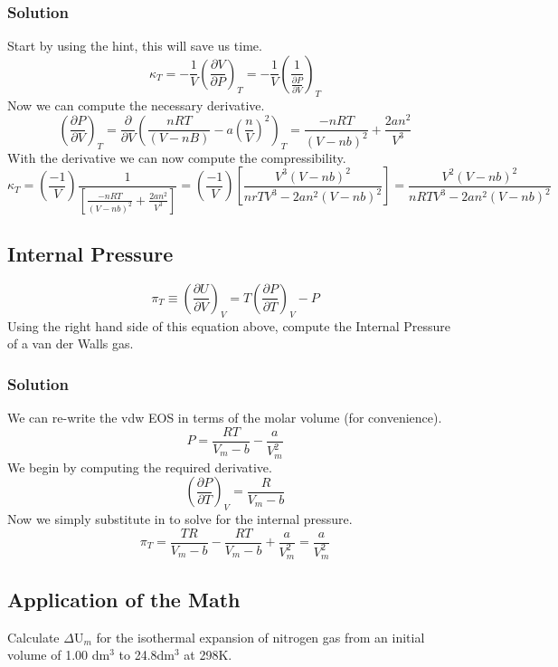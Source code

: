 \documentclass{article}
\newcommand{\be}{\begin{equation}}
\newcommand{\ee}{\end{equation}}
\newcommand{\pd}{\partial}
\begin{document}
\subsubsection{Solution}
Start by using the hint, this will save us time.
\be
\kappa_T = -\frac{1}{V}\left(\frac{\pd V}{\pd P}\right)_T = -\frac{1}{V}\left(\frac{1}{\frac{\pd P}{\pd V}}\right)_T 
\ee
Now we can compute the necessary derivative. 
\be
\left(\frac{\pd P}{\pd V}\right)_T = \frac{\pd}{\pd V}\left(\frac{nRT}{(V-nB)} - a\left(\frac{n}{V}\right)^2\right)_T = \frac{-nRT}{(V-nb)^2} + \frac{2an^2}{V^3}
\ee
With the derivative we can now compute the compressibility. 
\be
\kappa_T = \left(\frac{-1}{V}\right) \frac{1}{ \left[\frac{-nRT}{(V-nb)^2} + \frac{2an^2}{V^3}\right]} = \left(\frac{-1}{V}\right)\left[\frac{V^3(V-nb)^2}{nrTV^3 - 2an^2(V-nb)^2}\right] = \frac{V^2(V-nb)^2}{nRTV^3 - 2an^2(V-nb)^2}
\ee

\subsection{Internal Pressure}
\be
\pi_T \equiv \left(\frac{\pd U}{\pd V}\right)_V = T\left(\frac{\pd P}{\pd T}\right)_V - P
\ee
Using the right hand side of this equation above, compute the Internal Pressure of a van der Walls gas.

\subsubsection{Solution}
We can re-write the vdw EOS in terms of the molar volume (for convenience). 
\be
P=\frac{RT}{V_m - b}-\frac{a}{V^2_m}
\ee
We begin by computing the required derivative. 
\be
\left(\frac{\pd P}{\pd T}\right)_V = \frac{R}{V_m-b}
\ee
Now we simply substitute in to solve for the internal pressure.
\be
\pi_T = \frac{TR}{V_m-b} - \frac{RT}{V_m - b}+\frac{a}{V^2_m} = \frac{a}{V^2_m} 
\ee

\subsection{Application of the Math}
Calculate $\Delta$U$_m$ for the isothermal expansion of nitrogen gas from an initial volume of 1.00 dm$^3$ to 24.8dm$^3$ at 298K. 
\end{document}
